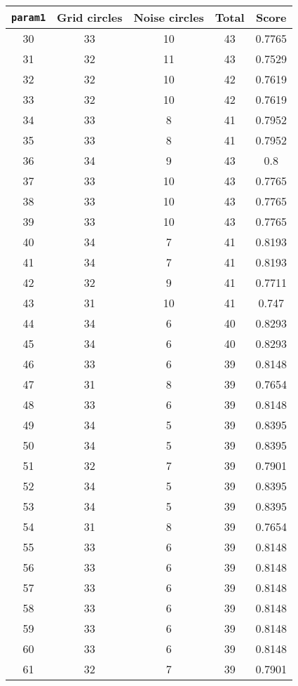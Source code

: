 \documentclass[letterpaper, 12pt]{article}
\begin{document}
\begin{longtable}{|c|c|c|c|c|}
\hline
\textbf{\texttt{param1}} & \textbf{Grid circles} & \textbf{Noise circles} & \textbf{Total} & \textbf{Score} \\
\hline
30 & 33 & 10 & 43 & 0.7765 \\
\hline
31 & 32 & 11 & 43 & 0.7529 \\
\hline
32 & 32 & 10 & 42 & 0.7619 \\
\hline
33 & 32 & 10 & 42 & 0.7619 \\
\hline
34 & 33 & 8 & 41 & 0.7952 \\
\hline
35 & 33 & 8 & 41 & 0.7952 \\
\hline
36 & 34 & 9 & 43 & 0.8 \\
\hline
37 & 33 & 10 & 43 & 0.7765 \\
\hline
38 & 33 & 10 & 43 & 0.7765 \\
\hline
39 & 33 & 10 & 43 & 0.7765 \\
\hline
40 & 34 & 7 & 41 & 0.8193 \\
\hline
41 & 34 & 7 & 41 & 0.8193 \\
\hline
42 & 32 & 9 & 41 & 0.7711 \\
\hline
43 & 31 & 10 & 41 & 0.747 \\
\hline
44 & 34 & 6 & 40 & 0.8293 \\
\hline
45 & 34 & 6 & 40 & 0.8293 \\
\hline
46 & 33 & 6 & 39 & 0.8148 \\
\hline
47 & 31 & 8 & 39 & 0.7654 \\
\hline
48 & 33 & 6 & 39 & 0.8148 \\
\hline
49 & 34 & 5 & 39 & 0.8395 \\
\hline
50 & 34 & 5 & 39 & 0.8395 \\
\hline
51 & 32 & 7 & 39 & 0.7901 \\
\hline
52 & 34 & 5 & 39 & 0.8395 \\
\hline
53 & 34 & 5 & 39 & 0.8395 \\
\hline
54 & 31 & 8 & 39 & 0.7654 \\
\hline
55 & 33 & 6 & 39 & 0.8148 \\
\hline
56 & 33 & 6 & 39 & 0.8148 \\
\hline
57 & 33 & 6 & 39 & 0.8148 \\
\hline
58 & 33 & 6 & 39 & 0.8148 \\
\hline
59 & 33 & 6 & 39 & 0.8148 \\
\hline
60 & 33 & 6 & 39 & 0.8148 \\
\hline
61 & 32 & 7 & 39 & 0.7901 \\

\end{longtable}
\end{document}
